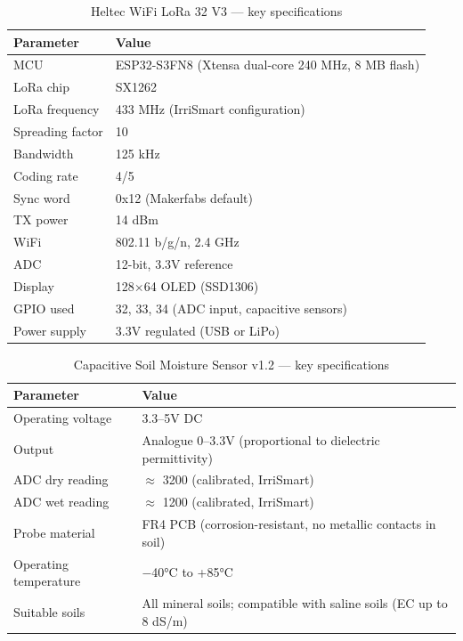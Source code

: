 \documentclass[12pt,a4paper]{report}
\begin{document}
\begin{table}[H]
\centering
\caption{Heltec WiFi LoRa 32 V3 --- key specifications}
\label{tab:heltec}
\begin{tabularx}{\textwidth}{lX}
\toprule
\textbf{Parameter} & \textbf{Value} \\
\midrule
MCU           & ESP32-S3FN8 (Xtensa dual-core 240 MHz, 8 MB flash) \\
LoRa chip     & SX1262 \\
LoRa frequency & 433 MHz (IrriSmart configuration) \\
Spreading factor & 10 \\
Bandwidth     & 125 kHz \\
Coding rate   & 4/5 \\
Sync word     & 0x12 (Makerfabs default) \\
TX power      & 14 dBm \\
WiFi          & 802.11 b/g/n, 2.4 GHz \\
ADC           & 12-bit, 3.3V reference \\
Display       & 128$\times$64 OLED (SSD1306) \\
GPIO used     & 32, 33, 34 (ADC input, capacitive sensors) \\
Power supply  & 3.3V regulated (USB or LiPo) \\
\bottomrule
\end{tabularx}
\end{table}

\begin{table}[H]
\centering
\caption{Capacitive Soil Moisture Sensor v1.2 --- key specifications}
\label{tab:sensor}
\begin{tabularx}{\textwidth}{lX}
\toprule
\textbf{Parameter} & \textbf{Value} \\
\midrule
Operating voltage   & 3.3--5V DC \\
Output              & Analogue 0--3.3V (proportional to dielectric permittivity) \\
ADC dry reading     & $\approx$ 3200 (calibrated, IrriSmart) \\
ADC wet reading     & $\approx$ 1200 (calibrated, IrriSmart) \\
Probe material      & FR4 PCB (corrosion-resistant, no metallic contacts in soil) \\
Operating temperature & $-$40°C to +85°C \\
Suitable soils      & All mineral soils; compatible with saline soils (EC up to 8 dS/m) \\
\bottomrule
\end{tabularx}
\end{table}
\end{document}
